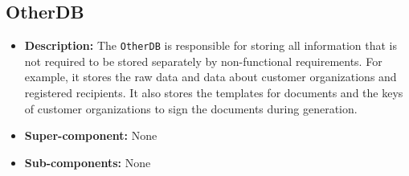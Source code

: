 \documentclass[a4paper,10pt]{article}
\begin{document}
\subsection{OtherDB}
\begin{itemize}
    \item \textbf{Description:} The \texttt{OtherDB} is responsible for storing all information that is not required to be stored separately by non-functional requirements. For example, it stores the raw data and data about customer organizations and registered recipients. It also stores the templates for documents and the keys of customer organizations to sign the documents during generation.
    \item \textbf{Super-component:} None
    \item \textbf{Sub-components:} None
\end{itemize}
\end{document}
